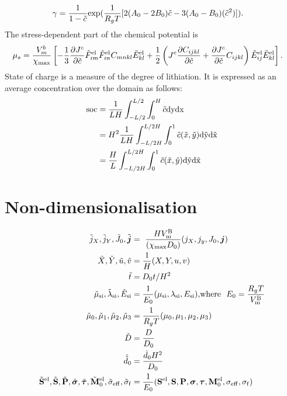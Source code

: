 \begin{align}
 \gamma &= \frac{1}{1-\tilde{c}}\text{exp}(\frac{1}{R_g T}[2(A_0 - 2B_0)\tilde{c} - 3(A_0 - B_0)(\tilde{c}^2)]).
\end{align}
The stress-dependent part of the chemical potential is \citep{2012JMPSCui}
\begin{align}
\mu_s &= \frac{V_m^b}{\chi_{{\rm{max}}}}\left[-\frac{1}{3}\frac{\partial {J^c}}{\partial \tilde{c}}\tilde{F}_{im}^{{\rm{el}}}\tilde{F}_{in}^{{\rm{el}}}{C}_{mnkl}\tilde{E}_{kl}^{{\rm{el}}} + \frac{1}{2}\left({J^c} \frac{\partial C_{ijkl}}{\partial \tilde{c}} + \frac{\partial {J^c}}{\partial \tilde{c}} C_{ijkl}\right)\tilde{E}_{ij}^{{\rm{el}}}\tilde{E}_{kl}^{{\rm{el}}}\right].
\end{align}
State of charge is a measure of the degree of lithiation. It is expressed as an average concentration over the domain as follows:
\begin{align}
 \rm{soc} &= \fc{1}{LH}\int_{-L/2}^{L/2} \int_0^H \tc \rm{d}y \rm{d}x  \nonumber \\
&= H^2\fc{1}{LH} \int_{-L/2H}^{L/2H} \int_0^1 \tc(\td{x}, \td{y}) \rm{d}\td{y} \rm{d}\td{x} \nonumber \\
&= \fc{H}{L}\int_{-L/2H}^{L/2H} \int_0^1 \tc(\td{x}, \td{y}) \rm{d}\td{y} \rm{d}\td{x} 
\end{align}

\section{Non-dimensionalisation}\label{section:nonDim}
\begin{align}
 \td{j}_X, \td{j}_Y, \td{J}_0, \td{\bm{j}} &=  \fc{H \vmb}{(\xmax D_0)} (j_X, j_y, J_0, \bm{j}) \\
 \tX, \tY, \tu, \tv &= \fc{1}{H}(X, Y, u, v) \\
 \td{t} &= D_0 t/H^2 \\
\tmusi, \tlamsi, \td{E}_{\text{si}} &= \fc{1}{E_0} (\mu_{\text{si}}, \lambda_{\text{si}}, E_{\text{si}}) 
\text{,where }  E_0 = \fc{R_g T}{\vmb} \\
\td{\mu}_0, \td{\mu}_1, \td{\mu}_2, \td{\mu}_3 &= \fc{1}{R_g T}(\mu_0, \mu_1, \mu_2, \mu_3) \\
\td{D} &= \fc{D}{D_0} \\
\dot{\td{d}}_{0} &= \fc{\dZEROdot H^2}{D_0} \\
\td{\PKS}^{\el}, \td{\PKS}, \td{\PK}, \td{\CS}, \td{\DCS}, \td{\mathbf{M}}^{\el}_{0}, \td{\sigma}_{\rm{eff}}, \td{\sigma}_{\rm{f}} &= \fc{1}{E_0}(\PKS^{\el}, \PKS, \PK, \CS, \DCS, \mathbf{M}^{\el}_{0}, \sigmaeff, \sigmaf)
\end{align}

